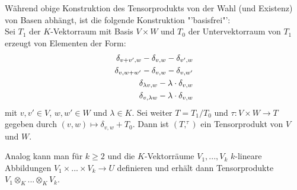\begin{remark}
	Während obige Konstruktion des Tensorprodukts von der Wahl (und Existenz) von Basen abhängt, ist die folgende Konstruktion "'basisfrei"': \\
	Sei $T_1$ der $K$-Vektorraum mit Basis $V\times W$ und $T_0$ der Untervektorraum von $T_1$ erzeugt von Elementen der Form:
	\begin{align}
		\delta_{v+v',w}-\delta_{v,w}-\delta_{v',w} \notag \\
		\delta_{v,w+w'}-\delta_{v,w}-\delta_{v,w'} \notag \\
		\delta_{\lambda v,w}-\lambda\cdot \delta_{v,w} \notag \\
		\delta_{v,\lambda w}-\lambda\cdot\delta_{v,w}\notag
	\end{align}
	mit $v,v'\in V$, $w,w'\in W$ und $\lambda\in K$. Sei weiter $T=T_1/T_0$ und $\tau:V\times W\to T$ gegeben durch $(v,w)\mapsto\delta_{v,w}+T_0$. Dann ist $(T,^\tau)$ ein Tensorprodukt von $V$ und $W$.
	\begin{center}
	\end{center}
\end{remark}

\begin{remark}
	Analog kann man für $k\ge 2$ und die $K$-Vektorräume $V_1,...,V_k$ $k$-lineare Abbildungen $V_1\times ...\times V_k\to U$ definieren und erhält dann Tensorprodukte $V_1\otimes_K ... \otimes_K V_k$.
\end{remark}